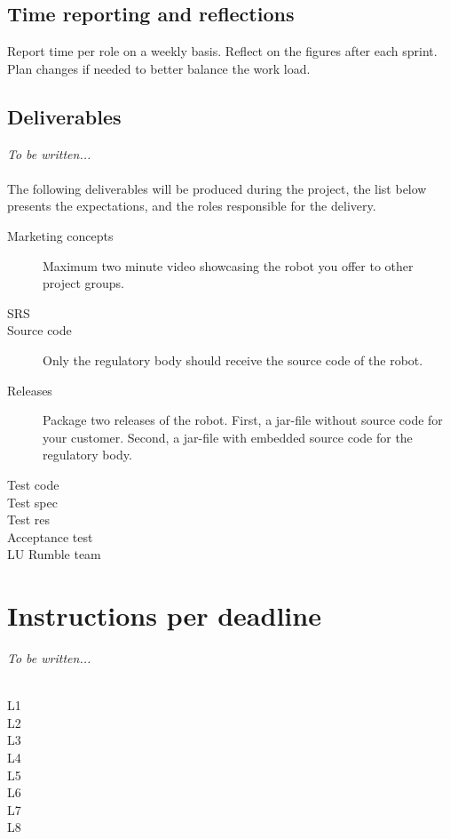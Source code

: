 \documentclass{scrreprt}
\begin{document}
\section{Time reporting and reflections} \label{sec:time}
Report time per role on a weekly basis. Reflect on the figures after each sprint. Plan changes if needed to better balance the work load.

\section{Deliverables}
\emph{To be written...}\\\\
The following deliverables will be produced during the project, the list below presents the expectations, and the roles responsible for the delivery.

\begin{description}
\item[Marketing concepts] Maximum two minute video showcasing the robot you offer to other project groups.
\item[SRS]
\item[Source code] Only the regulatory body should receive the source code of the robot.
\item[Releases] Package two releases of the robot. First, a jar-file without source code for your customer. Second, a jar-file with embedded source code for the regulatory body.
\item[Test code]
\item[Test spec]
\item[Test res]
\item[Acceptance test]
\item[LU Rumble team]
\end{description}

\chapter{Instructions per deadline}
\emph{To be written...}\\\\

\begin{description}
\item[L1]
\item[L2]
\item[L3]
\item[L4]
\item[L5]
\item[L6]
\item[L7]
\item[L8]
\end{description}
\end{document}
